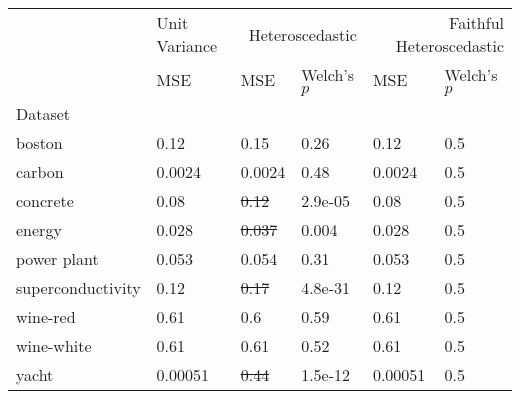 \begin{tabular}{l|l|ll|ll}
\toprule
 & Unit Variance & \multicolumn{2}{r}{Heteroscedastic} & \multicolumn{2}{r}{Faithful Heteroscedastic} \\
 & MSE & MSE & Welch's $p$ & MSE & Welch's $p$ \\
Dataset &  &  &  &  &  \\
\midrule
boston & 0.12 & 0.15 & 0.26 & 0.12 & 0.5 \\
carbon & 0.0024 & 0.0024 & 0.48 & 0.0024 & 0.5 \\
concrete & 0.08 & \sout{0.12} & 2.9e-05 & 0.08 & 0.5 \\
energy & 0.028 & \sout{0.037} & 0.004 & 0.028 & 0.5 \\
power plant & 0.053 & 0.054 & 0.31 & 0.053 & 0.5 \\
superconductivity & 0.12 & \sout{0.17} & 4.8e-31 & 0.12 & 0.5 \\
wine-red & 0.61 & 0.6 & 0.59 & 0.61 & 0.5 \\
wine-white & 0.61 & 0.61 & 0.52 & 0.61 & 0.5 \\
yacht & 0.00051 & \sout{0.44} & 1.5e-12 & 0.00051 & 0.5 \\
\bottomrule
\end{tabular}
